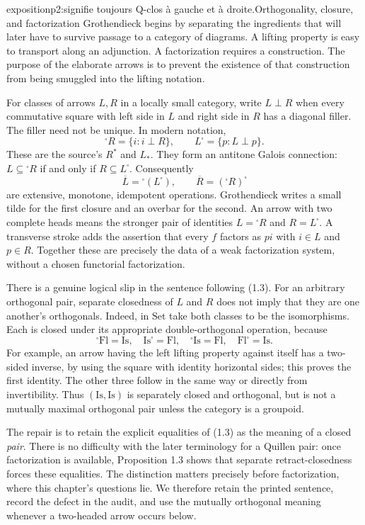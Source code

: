 
\begin{dcomment}{exposition}{p2:signifie toujours Q-clos à gauche et à droite.}{Orthogonality, closure, and factorization}
Grothendieck begins by separating the ingredients that will later have to survive passage to a category of diagrams. A lifting property is easy to transport along an adjunction. A factorization requires a construction. The purpose of the elaborate arrows is to prevent the existence of that construction from being smuggled into the lifting notation.

For classes of arrows $L,R$ in a locally small category, write $L\perp R$ when every commutative square with left side in $L$ and right side in $R$ has a diagonal filler. The filler need not be unique. In modern notation,
\[
 {}^{\square}R=\{i:i\perp R\},\qquad
 L^{\square}=\{p:L\perp p\}.
\]
These are the source's $R^*$ and $L_*$. They form an antitone Galois connection: $L\subseteq{}^{\square}R$ if and only if $R\subseteq L^{\square}$. Consequently
\[
 \overline L={}^{\square}(L^{\square}),\qquad
 \overline R=({}^{\square}R)^{\square}
\]
are extensive, monotone, idempotent operations. Grothendieck writes a small tilde for the first closure and an overbar for the second. An arrow with two complete heads means the stronger pair of identities $L={}^{\square}R$ and $R=L^{\square}$. A transverse stroke adds the assertion that every $f$ factors as $pi$ with $i\in L$ and $p\in R$. Together these are precisely the data of a weak factorization system, without a chosen functorial factorization.

There is a genuine logical slip in the sentence following (1.3). For an arbitrary orthogonal pair, separate closedness of $L$ and $R$ does not imply that they are one another's orthogonals. Indeed, in $\mathrm{Set}$ take both classes to be the isomorphisms. Each is closed under its appropriate double-orthogonal operation, because
\[
 {}^{\square}\mathrm{Fl}=\mathrm{Is},\quad
 \mathrm{Is}^{\square}=\mathrm{Fl},\quad
 {}^{\square}\mathrm{Is}=\mathrm{Fl},\quad
 \mathrm{Fl}^{\square}=\mathrm{Is}.
\]
For example, an arrow having the left lifting property against itself has a two-sided inverse, by using the square with identity horizontal sides; this proves the first identity. The other three follow in the same way or directly from invertibility. Thus $(\mathrm{Is},\mathrm{Is})$ is separately closed and orthogonal, but is not a mutually maximal orthogonal pair unless the category is a groupoid.

The repair is to retain the explicit equalities of (1.3) as the meaning of a closed \emph{pair}. There is no difficulty with the later terminology for a Quillen pair: once factorization is available, Proposition 1.3 shows that separate retract-closedness forces these equalities. The distinction matters precisely before factorization, where this chapter's questions lie. We therefore retain the printed sentence, record the defect in the audit, and use the mutually orthogonal meaning whenever a two-headed arrow occurs below.
\end{dcomment}

